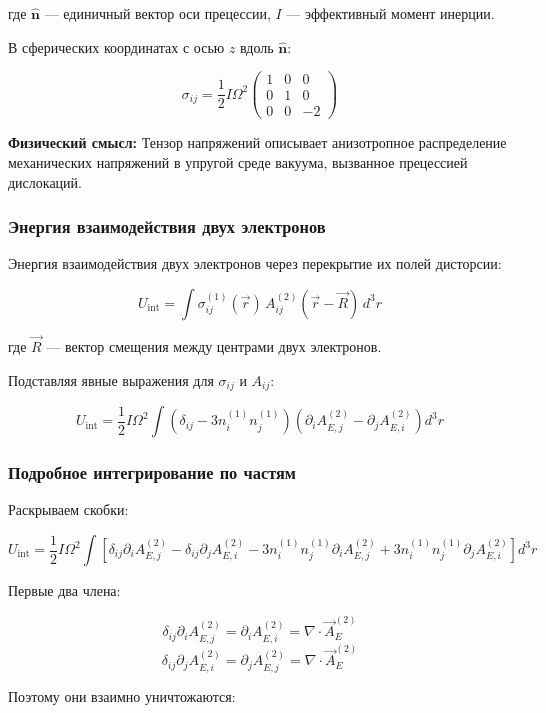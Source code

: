 \documentclass[12pt]{article}
\begin{document}
где $\hat{\boldsymbol{n}}$ — единичный вектор оси прецессии, $I$ — эффективный момент инерции.

В сферических координатах с осью $z$ вдоль $\hat{\boldsymbol{n}}$:

\[
\sigma_{ij} = \frac{1}{2} I \Omega^2 \begin{pmatrix}
1 & 0 & 0 \\
0 & 1 & 0 \\
0 & 0 & -2
\end{pmatrix}
\]

\textbf{Физический смысл:} Тензор напряжений описывает анизотропное распределение механических напряжений в упругой среде вакуума, вызванное прецессией дислокаций.

\subsubsection{Энергия взаимодействия двух электронов}

Энергия взаимодействия двух электронов через перекрытие их полей дисторсии:

\[
U_{\text{int}} = \int \sigma_{ij}^{(1)}(\vec{r}) \, A_{ij}^{(2)}(\vec{r} - \vec{R}) \, d^3r
\]

где $\vec{R}$ — вектор смещения между центрами двух электронов.

Подставляя явные выражения для $\sigma_{ij}$ и $A_{ij}$:

\[
U_{\text{int}} = \frac{1}{2} I \Omega^2 \int \left( \delta_{ij} - 3 n_i^{(1)} n_j^{(1)} \right) \left( \partial_i A_{E,j}^{(2)} - \partial_j A_{E,i}^{(2)} \right) d^3r
\]

\subsubsection{Подробное интегрирование по частям}

Раскрываем скобки:

\[
U_{\text{int}} = \frac{1}{2} I \Omega^2 \int \left[ \delta_{ij} \partial_i A_{E,j}^{(2)} - \delta_{ij} \partial_j A_{E,i}^{(2)} - 3 n_i^{(1)} n_j^{(1)} \partial_i A_{E,j}^{(2)} + 3 n_i^{(1)} n_j^{(1)} \partial_j A_{E,i}^{(2)} \right] d^3r
\]

Первые два члена:

\[
\delta_{ij} \partial_i A_{E,j}^{(2)} = \partial_i A_{E,i}^{(2)} = \nabla \cdot \vec{A}_E^{(2)}
\]
\[
\delta_{ij} \partial_j A_{E,i}^{(2)} = \partial_j A_{E,j}^{(2)} = \nabla \cdot \vec{A}_E^{(2)}
\]

Поэтому они взаимно уничтожаются:
\end{document}
